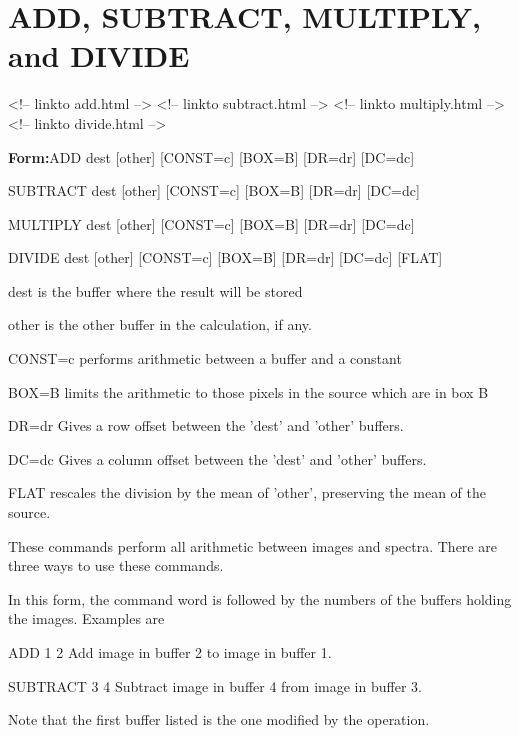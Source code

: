 \section{ADD, SUBTRACT, MULTIPLY, and DIVIDE}
\begin{rawhtml}
<!-- linkto add.html -->
<!-- linkto subtract.html -->
<!-- linkto multiply.html -->
<!-- linkto divide.html -->
\end{rawhtml}
\begin{command}
  \item[\textbf{Form:}ADD        dest {[other]} {[CONST=c]} {[BOX=B]} {[DR=dr]} {[DC=dc]}\hfill]{}
  \item[SUBTRACT   dest {[other]} {[CONST=c]} {[BOX=B]} {[DR=dr]} {[DC=dc]}\hfill]{}
  \item[MULTIPLY   dest {[other]} {[CONST=c]} {[BOX=B]} {[DR=dr]} {[DC=dc]}\hfill]{}
  \item[DIVIDE     dest {[other]} {[CONST=c]} {[BOX=B]} {[DR=dr]} {[DC=dc]} {[FLAT]}\hfill]{}
  \item[dest]{is the buffer where the result will be stored}
  \item[other]{is the other buffer in the calculation, if any.}
  \item[CONST=c]{performs arithmetic between a buffer and a constant}
  \item[BOX=B]{limits the arithmetic to those pixels
in the source which are in box B}
  \item[DR=dr]{Gives a row offset between the 'dest' and 'other' buffers.}
  \item[DC=dc]{Gives a column offset between the 'dest' and 'other' buffers.}
  \item[FLAT]{rescales the division by the mean of 'other', preserving the 
mean of the source.}
\end{command}
These commands perform all arithmetic between images and spectra.  There
are three ways to use these commands.


In this form, the command word is followed by the numbers of the buffers
holding the images.  Examples are
\begin{example}
  \item[ADD 1 2\hfill]{Add image in buffer 2 to image in buffer 1.}
  \item[SUBTRACT 3 4\hfill]{Subtract image in buffer 4 from image in buffer 3.}
\end{example}
Note that the first buffer listed is the one modified by the operation.

